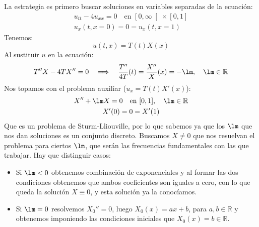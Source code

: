 \begin{ejemplo}
    \noindent
    La estrategia es primero buscar soluciones en variables separadas de la ecuación:
    \begin{gather*}
        u_{tt} - 4 u_{xx} = 0 \quad \text{en\ } \left[0,\infty\right[\times [0,1] \\
            u_x(t,x=0) = 0 = u_x(t,x=1)
    \end{gather*}
    Tenemos:
    \begin{equation*}
        u(t,x) = T(t)X(x)
    \end{equation*}
    Al sustituir $u$ en la ecuación:
    \begin{equation*}
        T''X - 4TX'' = 0 \quad\Longrightarrow\quad \frac{T''}{4T}(t) = \frac{X''}{X}(x) = -\lm, \quad \lm \in \mathbb{R}
    \end{equation*}
    Nos topamos con el problema auxiliar ($u_x = T(t)X'(x)$):
    \begin{gather*}
        X'' + \lm X = 0 \quad \text{en\ } [0,1], \quad \lm \in \mathbb{R} \\
        X'(0) = 0 = X'(1)
    \end{gather*}
    Que es un problema de Sturm-Lliouville, por lo que sabemos ya que los $\lm$ que nos dan soluciones es un conjunto discreto. Buscamos $X\neq 0$  que nos resuelvan el problema para ciertos $\lm$, que serán las frecuencias fundamentales con las que trabajar. Hay que distinguir casos:
    \begin{itemize}
        \item Si $\lm < 0$ obtenemos combinación de exponenciales y al formar las dos condiciones obtenemos que ambos coeficientes son iguales a cero, con lo que queda la solución $X\equiv 0$, y esta solución ya la conocíamos.
        \item Si $\lm = 0$ resolvemos $X_0'' = 0$, luego $X_0(x) = ax+b$, para $a,b\in \mathbb{R}$ y obtenemos imponiendo las condiciones iniciales que $X_0(x) = b\in \mathbb{R}$. 


\end{itemize}
\end{ejemplo}
